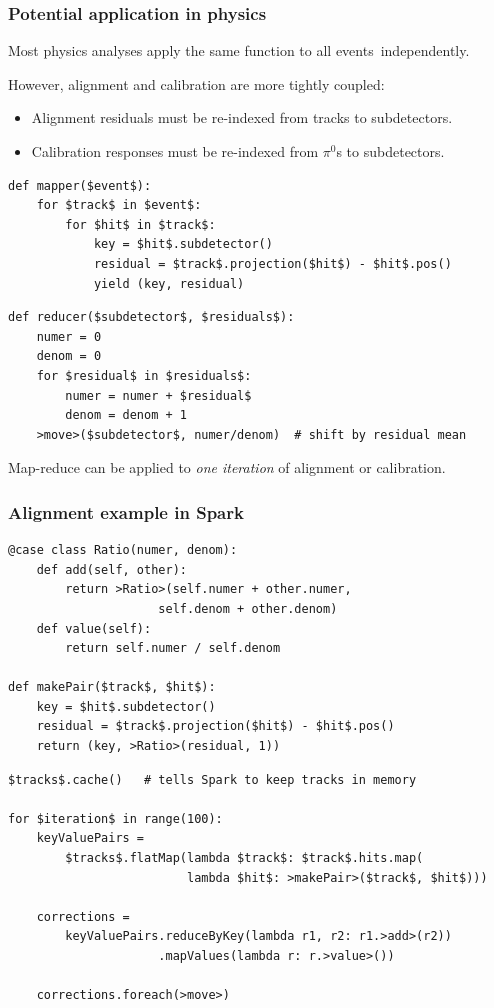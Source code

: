 \documentclass{beamer}
\begin{document}
\begin{frame}[fragile]
\frametitle{Potential application in physics}

Most physics analyses apply the same function to all \mbox{events independently.\hspace{-1 cm}}

However, alignment and calibration are more tightly coupled:
\begin{itemize}
\item Alignment residuals must be re-indexed from tracks to subdetectors.
\item Calibration responses must be re-indexed from $\pi^0$s to subdetectors.
\end{itemize}

\begin{lstlisting}[frame=single]
def mapper($event$):
    for $track$ in $event$:
        for $hit$ in $track$:
            key = $hit$.subdetector()
            residual = $track$.projection($hit$) - $hit$.pos()
            yield (key, residual)
\end{lstlisting}

\begin{lstlisting}[frame=single]
def reducer($subdetector$, $residuals$):
    numer = 0
    denom = 0
    for $residual$ in $residuals$:
        numer = numer + $residual$
        denom = denom + 1
    >move>($subdetector$, numer/denom)  # shift by residual mean
\end{lstlisting}

Map-reduce can be applied to {\it one iteration} of alignment or calibration.
\end{frame}

\begin{frame}[fragile]
\frametitle{Alignment example in Spark}

\begin{lstlisting}
@case class Ratio(numer, denom):
    def add(self, other):
        return >Ratio>(self.numer + other.numer,
                     self.denom + other.denom)
    def value(self):
        return self.numer / self.denom

def makePair($track$, $hit$):
    key = $hit$.subdetector()
    residual = $track$.projection($hit$) - $hit$.pos()
    return (key, >Ratio>(residual, 1))
\end{lstlisting}

\begin{lstlisting}[frame=single]
$tracks$.cache()   # tells Spark to keep tracks in memory

for $iteration$ in range(100):
    keyValuePairs =
        $tracks$.flatMap(lambda $track$: $track$.hits.map(
                         lambda $hit$: >makePair>($track$, $hit$)))

    corrections =
        keyValuePairs.reduceByKey(lambda r1, r2: r1.>add>(r2))
                     .mapValues(lambda r: r.>value>())

    corrections.foreach(>move>)
\end{lstlisting}
\end{frame}
\end{document}
